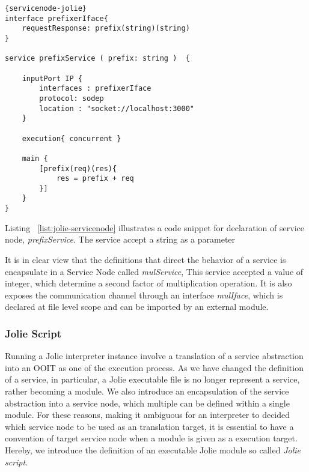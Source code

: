 \begin{listing}[h]

    \lstset{language=Jolie,
        style=codeStyle,
        numbers=left,
        firstnumber=1
    }
    \begin{lstlisting}[frame=tlrb, caption= {Jolie Service Node Example}, label={list:jolie-servicenode} ]{servicenode-jolie}
interface prefixerIface{
    requestResponse: prefix(string)(string)
}

service prefixService ( prefix: string )  {
    
    inputPort IP {
        interfaces : prefixerIface
        protocol: sodep
        location : "socket://localhost:3000"
    }

    execution{ concurrent }

    main {
        [prefix(req)(res){
            res = prefix + req
        }]
    }
}
    \end{lstlisting}
\end{listing}

Listing ~\ref{list:jolie-servicenode} illustrates a code snippet for declaration of service node, \textit{prefixService}. The service accept a string as a parameter 

It is in clear view that the definitions that direct the behavior of a service is encapsulate in a Service Node called \textit{mulService}, This service accepted a value of integer, which determine a second factor of multiplication operation. It is also exposes the communication channel through an interface \textit{mulIface}, which is declared at file level scope and can be imported by an external module.

\FloatBarrier

\subsubsection*{Jolie Script}

Running a Jolie interpreter instance involve a translation of a service abstraction into an OOIT as one of the execution process.
As we have changed the definition of a service, in particular, a Jolie executable file is no longer represent a service, rather becoming a module.   
We also introduce an encapsulation of the service abstraction into a service node, which multiple can be defined within a single module.
For these reasons, making it ambiguous for an interpreter to decided which service node to be used as an translation target, it is essential to have a convention of target service node when a module is given as a execution target.
Hereby, we introduce the definition of an executable Jolie module so called \textit{Jolie script}.

